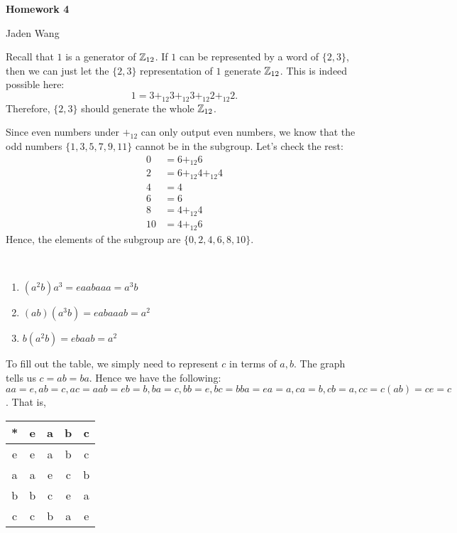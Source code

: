 \documentclass[12pt]{article}
\begin{document}
\centerline {\textsf{\textbf{\LARGE{Homework 4}}}}
\centerline {Jaden Wang}
\vspace{.15in}

\begin{problem}[7.1]
Recall that $ 1$ is a generator of  $ \mathbb{Z}_{12}$. If $ 1$ can be represented by a word of $ \{2,3\} $, then we can just let the  $ \{2,3\} $ representation of $ 1$ generate $ \mathbb{Z}_{12}$. This is indeed possible here:
\[
1 = 3 +_{ 12} 3+_{ 12} 3+_{ 12} 2+_{ 12}  2 
.\]
Therefore, $ \{2,3\} $ should generate the whole $ \mathbb{Z}_{12}$.
\end{problem}
\begin{problem}[7.2]
Since even numbers under $ +_{ 12} $ can only output even numbers, we know that the odd numbers $ \{1,3,5,7,9,11\} $ cannot be in the subgroup. Let's check the rest:
\begin{align*}
	0 &= 6 +_{ 12} 6\\
	2 &= 6 +_{ 12} 4 +_{ 12} 4 \\
	4 &= 4 \\
	6 &= 6 \\
	8 &= 4 +_{ 12} 4 \\
	10 &= 4 +_{ 12} 6 
\end{align*}
Hence, the elements of the subgroup are $ \{0,2,4,6,8,10\} $.
\end{problem}

\begin{problem}[7.7]
~\begin{enumerate}[label=\alph*)]
	\item $ (a^2 b)  a^3 = eaabaaa = a^3 b$
	\item $ (ab)(a^3 b) = eabaaab = a^2$ 
	\item $ b(a^2 b) = ebaab = a^2$
\end{enumerate}
\end{problem}
\begin{problem}[7.8]
	To fill out the table, we simply need to represent $ c$ in terms of  $ a,b$. The graph tells us  $ c = ab = ba$. Hence we have the following: $ aa=e,ab=c,ac=aab=eb=b,ba=c,bb=e,bc=bba=ea = a, ca=b,cb=a,cc=c(ab)=ce=c$. That is,
 \begin{table}[H]
	\centering
	\begin{tabular}{c||c|c|c|c}
		*&e&a&b&c\\
		\hline
		\hline
		e&e&a&b&c\\
		\hline
		a&a&e&c&b\\
		\hline
		b&b&c&e&a\\
		\hline
		c&c&b&a&e
	\end{tabular}
\end{table}
\end{problem}
\end{document}
